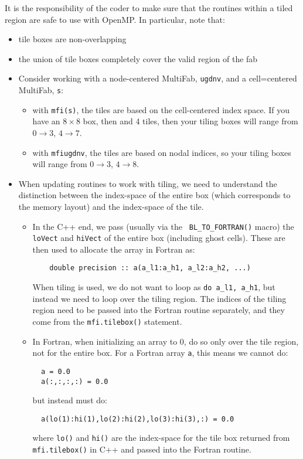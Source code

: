 It is the responsibility of the coder to make sure that the routines within
a tiled region are safe to use with OpenMP.  In particular, note that:
\begin{itemize}
\item tile boxes are non-overlapping
\item the union of tile boxes completely cover the valid region of the fab
\item Consider working with a node-centered MultiFab, {\tt ugdnv}, and a
cell=centered MultiFab, {\tt s}:
  \begin{itemize}

  \item with {\tt mfi(s)}, the tiles are based on the cell-centered
  index space.  If you have an $8\times 8$ box, then and 4 tiles, then
  your tiling boxes will range from $0\rightarrow 3$, $4\rightarrow
  7$.

  \item with {\tt mfi{ugdnv}}, the tiles are based on nodal indices,
  so your tiling boxes will range from $0\rightarrow 3$, $4\rightarrow 8$.

  \end{itemize}  
\item When updating routines to work with tiling, we need to understand
the distinction between the index-space of the entire box (which
corresponds to the memory layout) and the index-space of the tile.

  \begin{itemize}

  \item In the C++ end, we pass (usually via the {\tt
  BL\_TO\_FORTRAN()} macro) the {\tt loVect} and {\tt hiVect} of the
  entire box (including ghost cells).  These are then used to allocate
  the array in Fortran as:
  \begin{lstlisting}
    double precision :: a(a_l1:a_h1, a_l2:a_h2, ...)
  \end{lstlisting}
  When tiling is used, we do not want to loop as {\tt do a\_l1, a\_h1},
  but instead we need to loop over the tiling region.  The indices of
  the tiling region need to be passed into the Fortran routine
  separately, and they come from the {\tt mfi.tilebox()} statement.

  \item In Fortran, when initializing an array to 0, do so only over
  the tile region, not for the entire box.  For a Fortran array {\tt a},
  this means we cannot do:
  \begin{lstlisting}
  a = 0.0
  a(:,:,:,:) = 0.0
  \end{lstlisting}
  but instead must do:
  \begin{lstlisting}
  a(lo(1):hi(1),lo(2):hi(2),lo(3):hi(3),:) = 0.0
  \end{lstlisting}
  where {\tt lo()} and {\tt hi()} are the index-space for the tile box
  returned from {\tt mfi.tilebox()} in C++ and passed into the Fortran
  routine.


\end{itemize}
\end{itemize}

